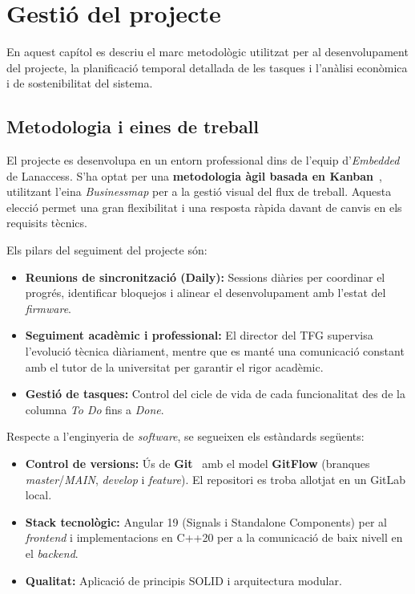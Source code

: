 \chapter{Gestió del projecte}
\label{ch:gestio}

En aquest capítol es descriu el marc metodològic utilitzat per al desenvolupament del projecte, la planificació temporal detallada de les tasques i l'anàlisi econòmica i de sostenibilitat del sistema.

\section{Metodologia i eines de treball}
El projecte es desenvolupa en un entorn professional dins de l’equip d’\textit{Embedded} de Lanaccess. S’ha optat per una \textbf{metodologia àgil basada en Kanban}~\cite{kanban_anderson}, utilitzant l’eina \textit{Businessmap} per a la gestió visual del flux de treball. Aquesta elecció permet una gran flexibilitat i una resposta ràpida davant de canvis en els requisits tècnics.

Els pilars del seguiment del projecte són:
\begin{itemize}
  \item \textbf{Reunions de sincronització (Daily):} Sessions diàries per coordinar el progrés, identificar bloquejos i alinear el desenvolupament amb l'estat del \textit{firmware}.
  \item \textbf{Seguiment acadèmic i professional:} El director del TFG supervisa l'evolució tècnica diàriament, mentre que es manté una comunicació constant amb el tutor de la universitat per garantir el rigor acadèmic.
  \item \textbf{Gestió de tasques:} Control del cicle de vida de cada funcionalitat des de la columna \textit{To Do} fins a \textit{Done}.
\end{itemize}

Respecte a l'enginyeria de \textit{software}, se segueixen els estàndards següents:
\begin{itemize}
  \item \textbf{Control de versions:} Ús de \textbf{Git}~\cite{git_version_control} amb el model \textbf{GitFlow} (branques \textit{master}/\textit{MAIN}, \textit{develop} i \textit{feature}). El repositori es troba allotjat en un GitLab local.
  \item \textbf{Stack tecnològic:} Angular 19 (Signals i Standalone Components) per al \textit{frontend} i implementacions en C++20 per a la comunicació de baix nivell en el \textit{backend}.
  \item \textbf{Qualitat:} Aplicació de principis SOLID \cite{solid_principles,cleancode} i arquitectura modular.
\end{itemize}

